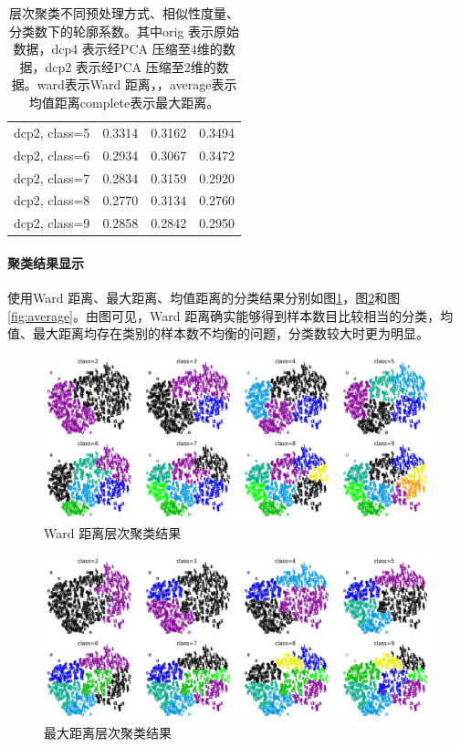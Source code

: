 \begin{table}[htbp]
\begin{tabular}{cccc}
dcp2, class=5 &  0.3314 &  0.3162 &   0.3494 \\
dcp2, class=6 &  0.2934 &  0.3067 &   0.3472 \\
dcp2, class=7 &  0.2834 &  0.3159 &   0.2920 \\
dcp2, class=8 &  0.2770 &  0.3134 &   0.2760 \\
dcp2, class=9 &  0.2858 &  0.2842 &   0.2950 \\
\bottomrule
\end{tabular}
\caption{层次聚类不同预处理方式、相似性度量、分类数下的轮廓系数。其中{\ttfamily orig} 表示原始数据，{\ttfamily dcp4} 表示经{\ttfamily PCA} 压缩至4维的数据，{\ttfamily dcp2} 表示经{\ttfamily PCA} 压缩至2维的数据。{\ttfamily ward}表示{\ttfamily Ward} 距离，，{\ttfamily average}表示均值距离{\ttfamily complete}表示最大距离。}
\label{tab:hierarchical}
\end{table}

\paragraph{聚类结果显示} 使用{\ttfamily Ward} 距离、最大距离、均值距离的分类结果分别如图\ref{fig:ward}，图\ref{fig:complete}和图\ref{fig:average}。由图可见，{\ttfamily Ward} 距离确实能够得到样本数目比较相当的分类，均值、最大距离均存在类别的样本数不均衡的问题，分类数较大时更为明显。

\begin{figure}
\centering
\includegraphics[width=15cm]{resource/ward.png}
\caption{{\ttfamily Ward} 距离层次聚类结果}
\label{fig:ward}
\end{figure}

\begin{figure}
\centering
\includegraphics[width=15cm]{resource/complete.png}
\caption{最大距离层次聚类结果}
\label{fig:complete}
\end{figure}

